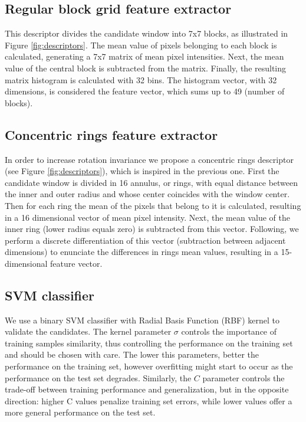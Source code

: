     \subsection{Regular block grid feature extractor}
      This descriptor divides the candidate window into 7x7 blocks, as illustrated in Figure \ref{fig:descriptors}. The mean value of pixels belonging to each block is calculated, generating a 7x7 matrix of mean pixel intensities. Next, the mean value of the central block is subtracted from the matrix. Finally, the resulting matrix histogram is calculated with 32 bins. The histogram vector, with 32 dimensions, is considered the feature vector, which sums up to 49 (number of blocks).

    \subsection{Concentric rings feature extractor}
      In order to increase rotation invariance we propose a concentric rings descriptor (see Figure \ref{fig:descriptors}), which is inspired in the previous one. First the candidate window is divided in 16 annulus, or rings, with equal distance between the inner and outer radius and whose center coincides with the window center. Then for each ring the mean of the pixels that belong to it is calculated, resulting in a 16 dimensional vector of mean pixel intensity. Next, the mean value of the inner ring (lower radius equals zero) is subtracted from this vector. Following, we perform a discrete differentiation of this vector (subtraction between adjacent dimensions) to enunciate the differences in rings mean values, resulting in a 15-dimensional feature vector.

    \subsection{SVM classifier}
      We use a binary SVM classifier with Radial Basis Function (RBF) kernel to validate the candidates. The kernel parameter $\sigma$ controls the importance of training samples similarity, thus controlling the performance on the training set and should be chosen with care. The lower this parameters, better the performance on the training set, however overfitting might start to occur as the performance on the test set degrades. Similarly, the $C$ parameter controls the trade-off between training performance and generalization, but in the opposite direction: higher C values penalize training set errors, while lower values offer a more general performance on the test set.

